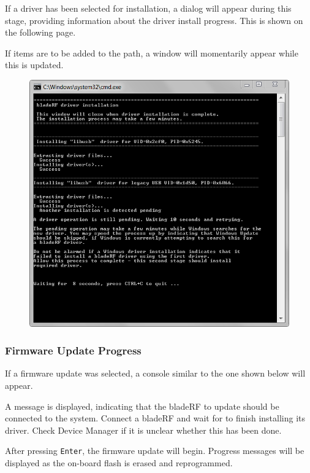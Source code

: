 {If a driver has been selected for installation, a dialog will appear
during this stage, providing information about the driver install progress.
This is shown on the following page.

If items are to be added to the \matlab path, a \matlab window
will momentarily appear while this is updated.


\newpage
\begin{figure}[h]
  \centering
  \includegraphics{images/windows/installer/driver-wait.png}
\end{figure}
\newpage

\newpage
\subsubsection{Firmware Update Progress}

If a firmware update was selected, a console similar to the one
shown below will appear.

A message is displayed, indicating that the bladeRF to update should
be connected to the system. Connect a bladeRF and wait for \windows
to finish installing its driver. Check Device Manager if it is unclear
whether this has been done.

After pressing \texttt{Enter}, the firmware update will begin.
Progress messages will be displayed as the on-board flash is
erased and reprogrammed.

}
